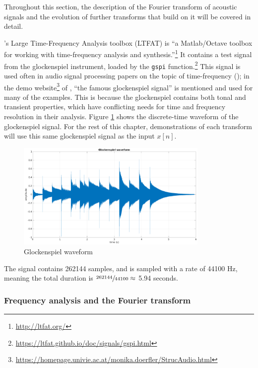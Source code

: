 \documentclass[report.tex]{subfiles}
\begin{document}
Throughout this section, the description of the Fourier transform of acoustic signals and the evolution of further transforms that build on it will be covered in detail.

\textcite{ltfat}'s Large Time-Frequency Analysis toolbox (LTFAT) is ``a Matlab/Octave toolbox for working with time-frequency analysis and synthesis.''\footnote{\url{http://ltfat.org/}} It contains a test signal from the glockenspiel instrument, loaded by the \Verb#gspi# function.\footnote{\url{https://ltfat.github.io/doc/signals/gspi.html}} This signal is used often in audio signal processing papers on the topic of time-frequency (\cite{doerflerphd, balazs, jaillet, tfjigsaw, invertiblecqt, wmdct}); in the demo website\footnote{\url{https://homepage.univie.ac.at/monika.doerfler/StrucAudio.html}} of \textcite{wmdct}, ``the famous glockenspiel signal'' is mentioned and used for many of the examples. This is because the glockenspiel contains both tonal and transient properties, which have conflicting needs for time and frequency resolution in their analysis. Figure \ref{fig:glockwaveform} shows the discrete-time waveform of the glockenspiel signal. For the rest of this chapter, demonstrations of each transform will use this same glockenspiel signal as the input $x[n]$.

\begin{figure}[ht]
	\centering
	\includegraphics[width=0.825\textwidth]{./images-gspi/gspi_time_domain.png}
	\caption{Glockenspiel waveform}
	\label{fig:glockwaveform}
\end{figure}

The signal contains 262144 samples, and is sampled with a rate of 44100 Hz, meaning the total duration is $\sfrac{262144}{44100} \approx$ 5.94 seconds.

\newpagefill

\subsubsection{Frequency analysis and the Fourier transform}
\label{sec:freqanal}
\end{document}
